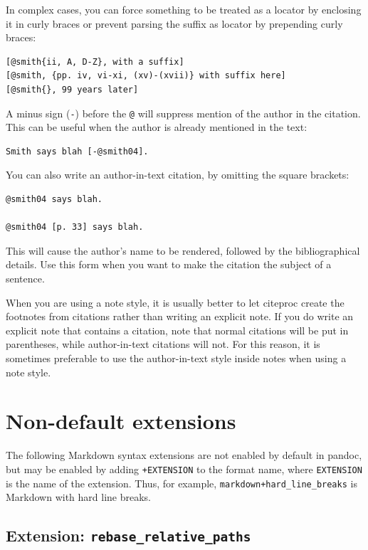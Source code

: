 \documentclass[
  b5paper
]{book}
\begin{document}
In complex cases, you can force something to be treated as a locator by
enclosing it in curly braces or prevent parsing the suffix as locator by
prepending curly braces:

\begin{verbatim}
[@smith{ii, A, D-Z}, with a suffix]
[@smith, {pp. iv, vi-xi, (xv)-(xvii)} with suffix here]
[@smith{}, 99 years later]
\end{verbatim}

A minus sign (\texttt{-}) before the \texttt{@} will suppress mention of
the author in the citation. This can be useful when the author is
already mentioned in the text:

\begin{verbatim}
Smith says blah [-@smith04].
\end{verbatim}

You can also write an author-in-text citation, by omitting the square
brackets:

\begin{verbatim}
@smith04 says blah.

@smith04 [p. 33] says blah.
\end{verbatim}

This will cause the author's name to be rendered, followed by the
bibliographical details. Use this form when you want to make the
citation the subject of a sentence.

When you are using a note style, it is usually better to let citeproc
create the footnotes from citations rather than writing an explicit
note. If you do write an explicit note that contains a citation, note
that normal citations will be put in parentheses, while author-in-text
citations will not. For this reason, it is sometimes preferable to use
the author-in-text style inside notes when using a note style.

\section{Non-default extensions}\label{non-default-extensions}

The following Markdown syntax extensions are not enabled by default in
pandoc, but may be enabled by adding \texttt{+EXTENSION} to the format
name, where \texttt{EXTENSION} is the name of the extension. Thus, for
example, \texttt{markdown+hard\_line\_breaks} is Markdown with hard line
breaks.

\subsection{\texorpdfstring{Extension:
\texttt{rebase\_relative\_paths}}{Extension: rebase\_relative\_paths}}\label{extension-rebase_relative_paths}
\end{document}
